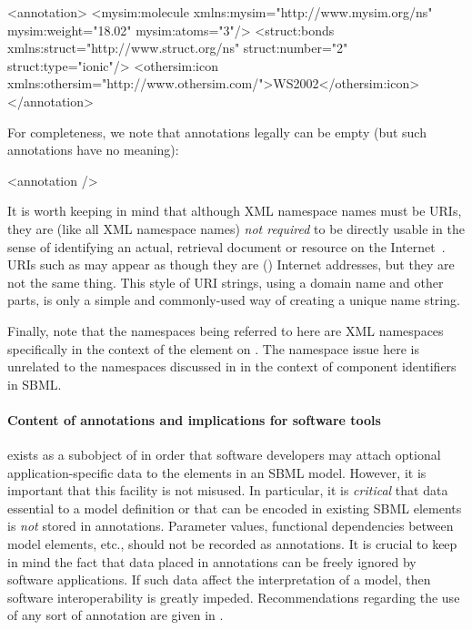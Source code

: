 \begin{example}
<annotation>
   <mysim:molecule xmlns:mysim="http://www.mysim.org/ns" mysim:weight="18.02" mysim:atoms="3"/>
   <struct:bonds xmlns:struct="http://www.struct.org/ns" struct:number="2" struct:type="ionic"/>
   <othersim:icon xmlns:othersim="http://www.othersim.com/">WS2002</othersim:icon>
</annotation>
\end{example}

For completeness, we note that annotations legally can be
empty (but such annotations have no meaning):

\begin{example}
<annotation />
\end{example}

It is worth keeping in mind that although XML namespace names must
be URIs, they are (like all XML namespace names) \emph{not
  required} to be directly usable in the sense of identifying an
actual, retrieval document or resource on the
Internet~\citep{bray:1999}.  URIs such as
 may appear as though they are (\eg)
Internet addresses, but they are not the same thing.  This style
of URI strings, using a domain name and other parts, is only a
simple and commonly-used way of creating a unique name string.

Finally, note that the namespaces being referred to here are XML
namespaces specifically in the context of the 
element on \SBase.  The namespace issue here is unrelated to the
namespaces discussed in  in the
context of component identifiers in SBML.


\paragraph{Content of annotations and implications for software tools}

\Annotation exists as a subobject of \SBase in
order that software developers may attach optional
application-specific data to the elements in an SBML model.
However, it is important that this facility is not misused.  In
particular, it is \emph{critical} that data essential to a model
definition or that can be encoded in existing SBML elements is
\emph{not} stored in annotations.  Parameter values,
functional dependencies between model elements, etc., should not
be recorded as annotations.  It is crucial to keep in mind the
fact that data placed in annotations can be freely ignored by
software applications.  If such data affect the interpretation of
a model, then software interoperability is greatly impeded.  
Recommendations regarding the use of any sort of annotation are
given in .  



